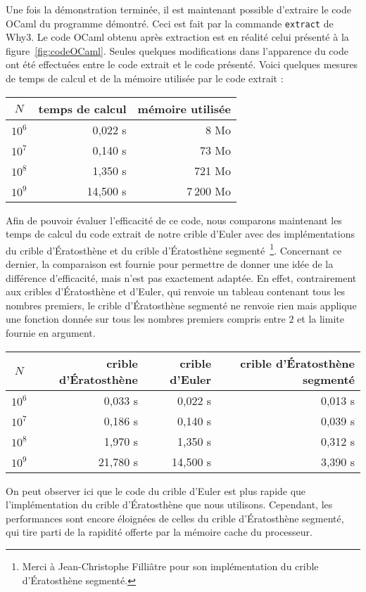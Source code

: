 \documentclass[a4paper]{easychair}
\begin{document}
Une fois la démonstration terminée, il est maintenant possible d'extraire
le code OCaml du programme démontré. Ceci est fait par la commande
\texttt{extract} de Why3.
Le code OCaml obtenu après extraction est en réalité celui présenté
à la figure~\ref{fig:codeOCaml}.
Seules quelques modifications dans l'apparence du code ont été effectuées
entre le code extrait et le code présenté.
Voici quelques mesures de temps de calcul et de la mémoire utilisée par
le code extrait :
\begin{center}
  \begin{tabular}{|c|r|r|}
    \hline
    $N$ & temps de calcul & mémoire utilisée \\
    \hline\hline
    $10^6$ &  0,022 s &      8 Mo \\\hline
    $10^7$ &  0,140 s &     73 Mo \\\hline
    $10^8$ &  1,350 s &    721 Mo \\\hline
    $10^9$ & 14,500 s & 7\,200 Mo \\\hline
  \end{tabular}
\end{center}

Afin de pouvoir évaluer l'efficacité de ce code, nous comparons maintenant
les temps de calcul du code extrait de notre crible d'Euler avec des
implémentations du crible d'Ératosthène et du crible d'Ératosthène
segmenté~\footnote{Merci à
  Jean-Christophe Filliâtre pour son implémentation du crible d'Ératosthène
  segmenté.}.
Concernant ce dernier, la comparaison est fournie pour permettre de donner
une idée de la différence d'efficacité, mais n'est pas exactement adaptée.
En effet, contrairement aux cribles d'Ératosthène et d'Euler, qui renvoie
un tableau contenant tous les nombres premiers, le crible d'Ératosthène
segmenté ne renvoie rien mais applique une fonction donnée sur tous les
nombres premiers compris entre $2$ et la limite fournie en argument.
\begin{center}
  \begin{tabular}{|c|r|r|r|}
    \hline
    $N$ & crible d'Ératosthène & crible d'Euler &
    \multicolumn{1}{|p{3.1cm}|}{crible d'Ératosthène segmenté}\\
    \hline\hline
    $10^6$ &  0,033 s &  0,022 s &  0,013 s \\\hline
    $10^7$ &  0,186 s &  0,140 s &  0,039 s \\\hline
    $10^8$ &  1,970 s &  1,350 s &  0,312 s \\\hline
    $10^9$ & 21,780 s & 14,500 s &  3,390 s \\\hline
  \end{tabular}
\end{center}
On peut observer ici que le code du crible d'Euler est plus rapide
que l'implémentation du crible d'Ératosthène que nous utilisons.
Cependant, les performances sont encore éloignées de celles du crible
d'Ératosthène segmenté, qui tire parti de la rapidité offerte
par la mémoire cache du processeur.
\end{document}

